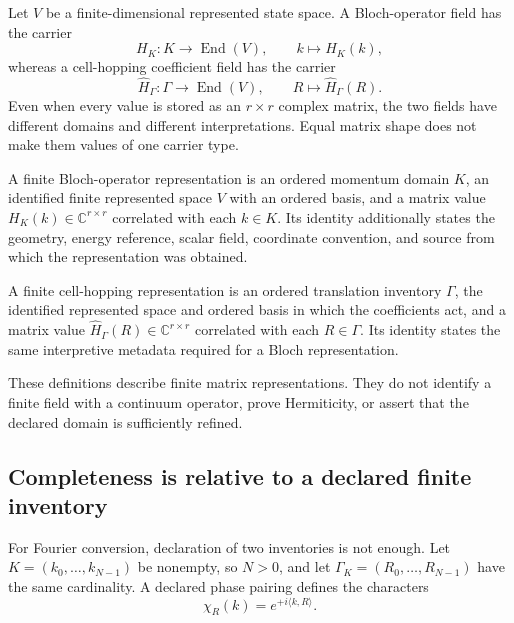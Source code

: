 Let $V$ be a finite-dimensional represented state space. A Bloch-operator field
has the carrier
\begin{equation}
  H_K:K\longrightarrow\operatorname{End}(V),
  \qquad k\longmapsto H_K(k),
  \label{eq:representation-carrier-bloch-field}
\end{equation}
whereas a cell-hopping coefficient field has the carrier
\begin{equation}
  \widehat H_\Gamma:\Gamma\longrightarrow\operatorname{End}(V),
  \qquad R\longmapsto\widehat H_\Gamma(R).
  \label{eq:representation-carrier-hopping-field}
\end{equation}
Even when every value is stored as an $r\times r$ complex matrix, the two
fields have different domains and different interpretations. Equal matrix
shape does not make them values of one carrier type.

\begin{definition}
A finite Bloch-operator representation is an ordered momentum domain $K$, an
identified finite represented space $V$ with an ordered basis, and a matrix
value $H_K(k)\in\mathbb C^{r\times r}$ correlated with each $k\in K$. Its
identity additionally states the geometry, energy reference, scalar field,
coordinate convention, and source from which the representation was obtained.
\end{definition}

\begin{definition}
A finite cell-hopping representation is an ordered translation inventory
$\Gamma$, the identified represented space and ordered basis in which the
coefficients act, and a matrix value
$\widehat H_\Gamma(R)\in\mathbb C^{r\times r}$ correlated with each
$R\in\Gamma$. Its identity states the same interpretive metadata required for
a Bloch representation.
\end{definition}

These definitions describe finite matrix representations. They do not identify
a finite field with a continuum operator, prove Hermiticity, or assert that the
declared domain is sufficiently refined.

\subsection{Completeness is relative to a declared finite inventory}

For Fourier conversion, declaration of two inventories is not enough. Let
$K=(k_0,\ldots,k_{N-1})$ be nonempty, so $N>0$, and let
$\Gamma_K=(R_0,\ldots,R_{N-1})$ have the same cardinality. A declared phase
pairing defines the characters
\begin{equation}
  \chi_R(k)=e^{+i\langle k,R\rangle}.
  \label{eq:representation-carrier-character-pairing}
\end{equation}


